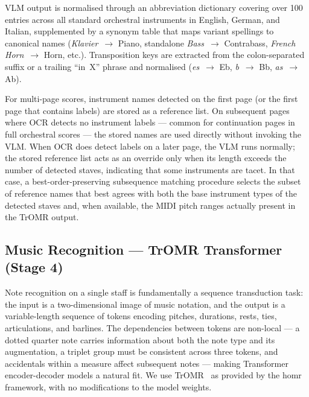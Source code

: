 \documentclass[11pt,a4paper]{article}
\begin{document}
VLM output is normalised through an abbreviation dictionary covering over 100 entries across all standard orchestral instruments in English, German, and Italian, supplemented by a synonym table that maps variant spellings to canonical names (\textit{Klavier}~$\to$ Piano, standalone \textit{Bass}~$\to$ Contrabass, \textit{French Horn}~$\to$ Horn, etc.).
Transposition keys are extracted from the colon-separated suffix or a trailing ``in~X'' phrase and normalised (\textit{es}~$\to$ Eb, \textit{b}~$\to$ Bb, \textit{as}~$\to$ Ab).

For multi-page scores, instrument names detected on the first page (or the first page that contains labels) are stored as a reference list.
On subsequent pages where OCR detects no instrument labels — common for continuation pages in full orchestral scores — the stored names are used directly without invoking the VLM.
When OCR does detect labels on a later page, the VLM runs normally; the stored reference list acts as an override only when its length exceeds the number of detected staves, indicating that some instruments are tacet.
In that case, a best-order-preserving subsequence matching procedure selects the subset of reference names that best agrees with both the base instrument types of the detected staves and, when available, the MIDI pitch ranges actually present in the TrOMR output.

\subsection{Music Recognition --- TrOMR Transformer (Stage 4)}

Note recognition on a single staff is fundamentally a sequence transduction task: the input is a two-dimensional image of music notation, and the output is a variable-length sequence of tokens encoding pitches, durations, rests, ties, articulations, and barlines.
The dependencies between tokens are non-local — a dotted quarter note carries information about both the note type and its augmentation, a triplet group must be consistent across three tokens, and accidentals within a measure affect subsequent notes — making Transformer encoder-decoder models a natural fit.
We use TrOMR~\cite{tromr} as provided by the homr framework, with no modifications to the model weights.
\end{document}
